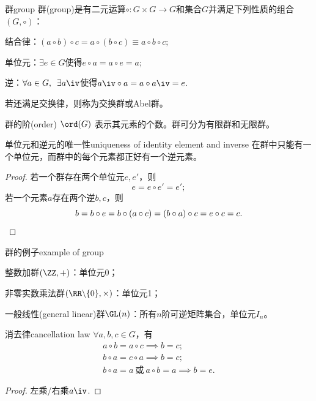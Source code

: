 \begin{definition}{群}{group}
	群(group)是有二元运算$\circ:G\times G\to G$和集合$G$并满足下列性质的组合$(G,\circ)$：
	\begin{compactitem}
		\item 结合律：$(a\circ b)\circ c=a\circ(b\circ c)\equiv a\circ b\circ c;$
		\item 单位元：$\exists e\in G$使得$e\circ a=a\circ e=a;$
		\item 逆：$\forall a\in G,\enspace\exists a\iv$使得$a\iv\circ a=a\circ a\iv=e.$
	\end{compactitem}
	若还满足交换律，则称为交换群或Abel群。

	\tcblower
	群的阶(order) $\ord(G)$ 表示其元素的个数。群可分为有限群和无限群。
\end{definition}
\begin{theorem}{单位元和逆元的唯一性}{uniqueness of identity element and inverse}
	在群中只能有一个单位元，而群中的每个元素都正好有一个逆元素。
\end{theorem}
\begin{proof}
	若一个群存在两个单位元$e,e'$，则 
	\[
		e=e\circ e'=e';
	\]
	若一个元素$a$存在两个逆$b,c$，则 
	\[
		b=b\circ e=b\circ(a\circ c)=(b\circ a)\circ c=e\circ c=c.
		\qedhere
	\]
\end{proof}
\begin{example}{群的例子}{example of group}
	\begin{compactitem}
		\item 整数加群$(\ZZ,+)$：单位元0；
		\item 非零实数乘法群$(\RR\backslash\{0\},\times)$：单位元1；
		\item 一般线性(general linear)群$\GL(n)$：所有$n$阶可逆矩阵集合，单位元$I_n$。
	\end{compactitem}
\end{example}
\begin{theorem}{消去律}{cancellation law}
	$\forall a,b,c\in G$，有
	\begin{subequations}
		\begin{gather}
			a\circ b=a\circ c\implies b=c;\\
			b\circ a=c\circ a\implies b=c;\\
			b\circ a=a~\text{或}~a\circ b=a\implies b=e.
		\end{gather}
	\end{subequations}
\end{theorem}
\begin{proof}
	左乘/右乘$a\iv$.
\end{proof}
